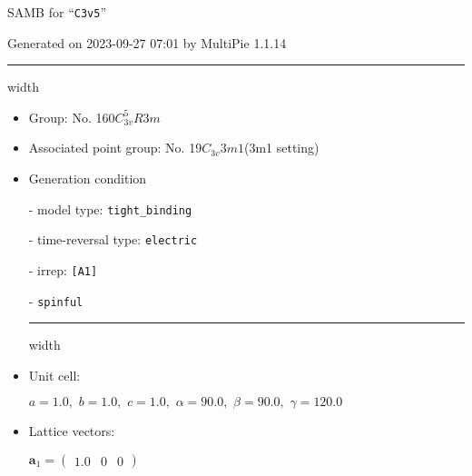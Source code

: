 \documentclass[fleqn,10pt,landscape]{article}
\begin{document}
\setcounter{MaxMatrixCols}{16}

\setlength{\baselineskip}{16pt}
\footnotesize
\begin{center}
\LARGE
SAMB for ``\texttt{C3v5}''
\end{center}
\begin{flushright}
Generated on 2023-09-27 07:01 by MultiPie 1.1.14
\end{flushright}
\vspace{1cm}


 \hfil \hrule height 1mm width \textwidth \hfil

\begin{itemize}
\item Group: No. 160\quad$C_{3v}^{5}$\quad$R3m$\quad[ trigonal ]

\item Associated point group: No. 19\quad$C_{3v}$\quad$3m1$\quad(3m1 setting)\quad[ trigonal ]

\vspace{5mm}

\item Generation condition

\quad - model type: \texttt{tight_binding}

\quad - time-reversal type: \texttt{electric}

\quad - irrep: \texttt{[A1]}

\quad - \texttt{spinful}


 \hfil \hrule height 1mm width \textwidth \hfil

\item Unit cell:

\quad $a=1.0,\,\, b=1.0,\,\, c=1.0,\,\, \alpha=90.0,\,\, \beta=90.0,\,\, \gamma=120.0$

\item Lattice vectors:

\quad $\bm{a}_1=\begin{pmatrix} 1.0 & 0 & 0 \end{pmatrix}$


\end{itemize}
\end{document}
